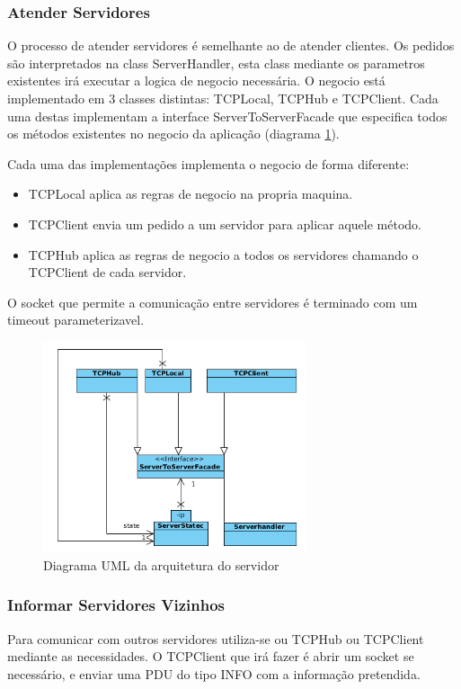 \documentclass[runningheads,a4paper]{llncs}
\begin{document}
\subsubsection{Atender Servidores}

O processo de atender servidores é semelhante ao de atender clientes.  Os pedidos são interpretados na class ServerHandler, esta class mediante os parametros existentes irá executar a logica de negocio necessária.
O negocio está implementado em 3 classes distintas: TCPLocal, TCPHub e TCPClient. Cada uma destas implementam a interface ServerToServerFacade que especifica todos os métodos existentes no negocio da aplicação (diagrama \ref{fig:diagram-facades}).

Cada uma das implementações implementa o negocio de forma diferente:
\begin{itemize}
\item TCPLocal aplica as regras de negocio na propria maquina.
\item TCPClient envia um pedido a um servidor para aplicar aquele método.
\item TCPHub aplica as regras de negocio a todos os servidores chamando o TCPClient de cada servidor.
\end{itemize}

O socket que permite a comunicação entre servidores é terminado com um timeout parameterizavel.

\begin{figure}
\centering
\includegraphics[height=6.2cm]{facades.png}
\caption{Diagrama UML da arquitetura do servidor}
\label{fig:diagram-facades}
\end{figure}


\subsubsection{Informar Servidores Vizinhos}

Para comunicar com outros servidores utiliza-se ou TCPHub ou TCPClient mediante as necessidades.
O TCPClient que irá fazer é abrir um socket se necessário, e enviar uma PDU do tipo INFO com a informação pretendida.
\end{document}
